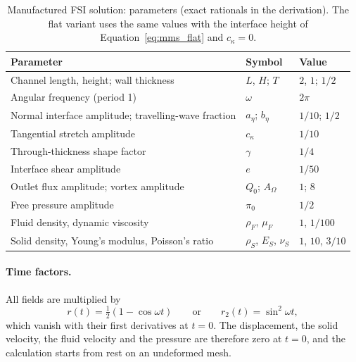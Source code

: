 \begin{table}[htbp]
	\centering
	\small
	\caption{Manufactured FSI solution: parameters (exact rationals in the derivation). The flat variant uses the same values with the interface height of Equation~\eqref{eq:mms_flat} and $c_\kappa = 0$.}
	\label{tab:mms_params}
	\begin{tabular}{lll}
		\toprule
		Parameter & Symbol & Value \\
		\midrule
		Channel length, height; wall thickness & $L$, $H$; $T$ & $2$, $1$; $1/2$ \\
		Angular frequency (period 1) & $\omega$ & $2\pi$ \\
		Normal interface amplitude; travelling-wave fraction & $a_\eta$; $b_\eta$ & $1/10$; $1/2$ \\
		Tangential stretch amplitude & $c_\kappa$ & $1/10$ \\
		Through-thickness shape factor & $\gamma$ & $1/4$ \\
		Interface shear amplitude & $e$ & $1/50$ \\
		Outlet flux amplitude; vortex amplitude & $Q_0$; $A_\Omega$ & $1$; $8$ \\
		Free pressure amplitude & $\pi_0$ & $1/2$ \\
		Fluid density, dynamic viscosity & $\rho_F$, $\mu_F$ & $1$, $1/100$ \\
		Solid density, Young's modulus, Poisson's ratio & $\rho_S$, $E_S$, $\nu_S$ & $1$, $10$, $3/10$ \\
		\bottomrule
	\end{tabular}
\end{table}

\paragraph{Time factors.}
All fields are multiplied by
\begin{equation}
	r(t) = \tfrac12\left(1 - \cos\omega t\right)
	\qquad\text{or}\qquad
	r_2(t) = \sin^2\omega t,
\end{equation}
which vanish with their first derivatives at $t = 0$.
The displacement, the solid velocity, the fluid velocity and the pressure are therefore zero at $t = 0$, and the calculation starts from rest on an undeformed mesh.

